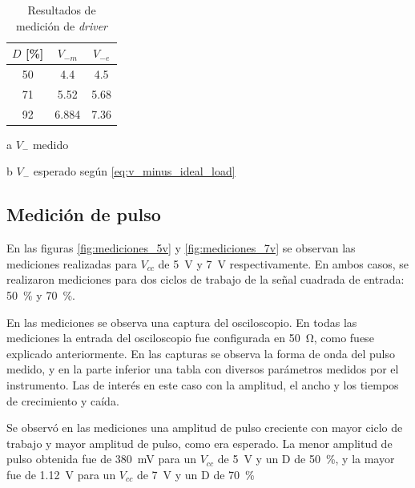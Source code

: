 \begin{table}[t!]
    \centering
    \begin{threeparttable}[b]
        \begin{tabular}{ccc}
        \hline
            $D$ [\unit{\percent}] & $V_{-m}$ \tnote{a} & $V_{-e}$ \tnote{b} \\
        \hline
            50 & 4.4 & 4.5 \\
            71 & 5.52 & 5.68 \\
            92 & 6.884 & 7.36  \\
        \hline
    \end{tabular}
    \begin{tablenotes}
        \item [a] $V_-$ medido
        \item [b] $V_-$ esperado según \ref{eq:v_minus_ideal_load}
    \end{tablenotes}
    \end{threeparttable}
    \caption{Resultados de medición de \textit{driver}}
    \label{tab:mediciones_driver_resultados}
\end{table}

\subsection{Medición de pulso}

En las figuras \ref{fig:mediciones_5v} y \ref{fig:mediciones_7v} se observan las
mediciones realizadas para $V_{cc}$ de \qty{5}{\volt} y \qty{7}{\volt}
respectivamente. En ambos casos, se realizaron mediciones para dos ciclos de
trabajo de la señal cuadrada de entrada: \qty{50}{\percent} y
\qty{70}{\percent}.

En las mediciones se observa una captura del osciloscopio. En todas las
mediciones la entrada del osciloscopio fue configurada en \qty{50}{\ohm}, como
fuese explicado anteriormente. En las capturas se observa la forma de onda del
pulso medido, y en la parte inferior una tabla con diversos parámetros
medidos por el instrumento. Las de interés en este caso con la amplitud, el
ancho y los tiempos de crecimiento y caída.

Se observó en las mediciones una amplitud de pulso creciente con mayor ciclo de
trabajo y mayor amplitud de pulso, como era esperado. La menor amplitud de pulso
obtenida fue de \qty{380}{\milli\volt} para un $V_{cc}$ de \qty{5}{\volt} y un D
de \qty{50}{\percent}, y la mayor fue de \qty{1.12}{\volt} para un $V_{cc}$
de \qty{7}{\volt} y un D de \qty{70}{\percent}

